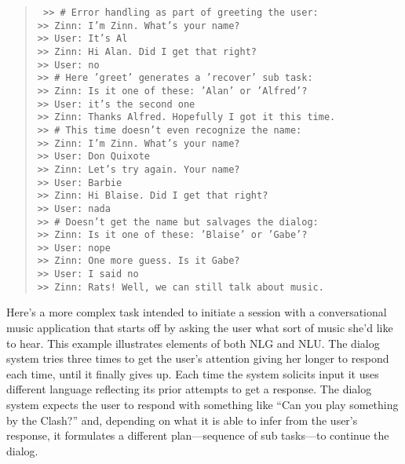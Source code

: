 \documentclass[letterpaper,11pt]{article}
\begin{document}
\begin{quotation} \tt
%
  \noindent
  >> \# Error handling as part of greeting the user:\\
  >> Zinn: I'm Zinn. What's your name?\\                 
  >> User: It's Al\\                                    
  >> Zinn: Hi Alan. Did I get that right?\\              
  >> User: no\\                                         
  >> \# Here 'greet' generates a 'recover' sub task:\\
  >> Zinn: Is it one of these: 'Alan' or 'Alfred'?\\     
  >> User: it's the second one\\  
  >> Zinn: Thanks Alfred. Hopefully I got it this time.\\
  >> \# This time doesn't even recognize the name:\\
  >> Zinn: I'm Zinn. What's your name?\\
  >> User: Don Quixote\\
  >> Zinn: Let's try again. Your name?\\
  >> User: Barbie\\
  >> Zinn: Hi Blaise. Did I get that right?\\
  >> User: nada\\
  >> \# Doesn't get the name but salvages the dialog:\\
  >> Zinn: Is it one of these: 'Blaise' or 'Gabe'?\\
  >> User: nope\\
  >> Zinn: One more guess. Is it Gabe?\\
  >> User: I said no\\
  >> Zinn: Rats! Well, we can still talk about music.\\
%
\end{quotation}
%
Here's a more complex task intended to initiate a session with a conversational music application that starts off by asking the user what sort of music she'd like to hear.  This example illustrates elements of both NLG and NLU. The dialog system tries three times to get the user's attention giving her longer to respond each time, until it finally gives up.  Each time the system solicits input it uses different language reflecting its prior attempts to get a response.  The dialog system expects the user to respond with something like ``Can you play something by the Clash?'' and, depending on what it is able to infer from the user's response, it formulates a different plan---sequence of sub tasks---to continue the dialog. 
\end{document}
